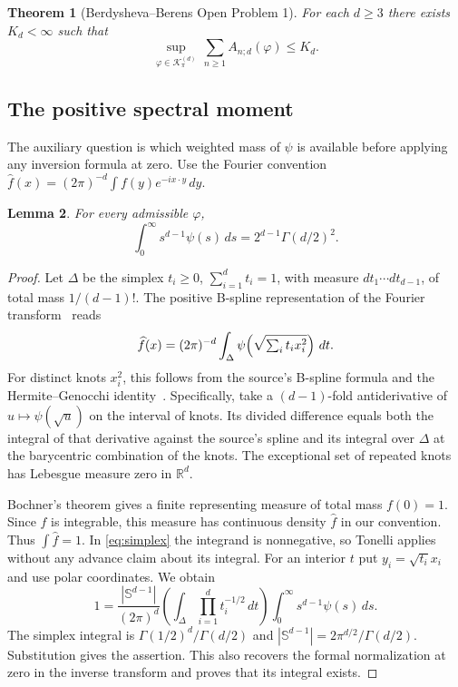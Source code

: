 \documentclass[11pt,a4paper]{article}
\newtheorem{theorem}{Theorem}[section]
\newtheorem{lemma}[theorem]{Lemma}
\theoremstyle{remark}\newtheorem{remark}[theorem]{Remark}
\numberwithin{equation}{section}
\begin{document}
\begin{theorem}[Berdysheva--Berens Open Problem 1]\label{thm:sampling}
For each $d\ge3$ there exists $K_d<\infty$ such that
\[
   \sup_{\varphi\in\mathcal K_\pi^{(d)}}\,
   \sum_{n\ge1} A_{n;d}(\varphi)\le K_d .
\]
\end{theorem}

\subsection{The positive spectral moment}
The auxiliary question is which weighted mass of $\psi$ is available before applying any inversion formula at zero. Use the Fourier convention $\widehat f(x)=(2\pi)^{-d}\int f(y)e^{-i x\cdot y}\,dy$.
\begin{lemma}\label{lem:mass}
For every admissible $\varphi$,
\[
  \int_0^\infty s^{d-1}\psi(s)\,ds
       =2^{d-1}\Gamma(d/2)^2.
\]
\end{lemma}
\begin{proof}
Let $\Delta$ be the simplex $t_i\ge0$, $\sum_{i=1}^d t_i=1$, with measure $dt_1\cdots dt_{d-1}$, of total mass $1/(d-1)!$. The positive B-spline representation of the Fourier transform~\cite[Theorem A]{BB16} reads
\begin{equation}
 \widehat f(x)=(2\pi)^{-d}\int_{\Delta}
      \psi\!\left(\sqrt{\smash[b]{\textstyle\sum_i t_i x_i^2}}\right)\,dt .
 \label{eq:simplex}
\end{equation}
For distinct knots $x_i^2$, this follows from the source's B-spline formula and the Hermite--Genocchi identity~\cite{deboor}. Specifically, take a $(d-1)$-fold antiderivative of $u\mapsto\psi(\sqrt u)$ on the interval of knots. Its divided difference equals both the integral of that derivative against the source's spline and its integral over $\Delta$ at the barycentric combination of the knots. The exceptional set of repeated knots has Lebesgue measure zero in $\mathbb R^d$.

Bochner's theorem gives a finite representing measure of total mass $f(0)=1$. Since $f$ is integrable, this measure has continuous density $\widehat f$ in our convention. Thus $\int\widehat f=1$. In \eqref{eq:simplex} the integrand is nonnegative, so Tonelli applies without any advance claim about its integral. For an interior $t$ put $y_i=\sqrt{t_i}x_i$ and use polar coordinates. We obtain
\[
 1=\frac{|\mathbb S^{d-1}|}{(2\pi)^d}
       \left(\int_\Delta\prod_{i=1}^d t_i^{-1/2}\,dt\right)
       \int_0^\infty s^{d-1}\psi(s)\,ds .
\]
The simplex integral is $\Gamma(1/2)^d/\Gamma(d/2)$ and $|\mathbb S^{d-1}|=2\pi^{d/2}/\Gamma(d/2)$. Substitution gives the assertion. This also recovers the formal normalization at zero in the inverse transform and proves that its integral exists.
\end{proof}
\end{document}
